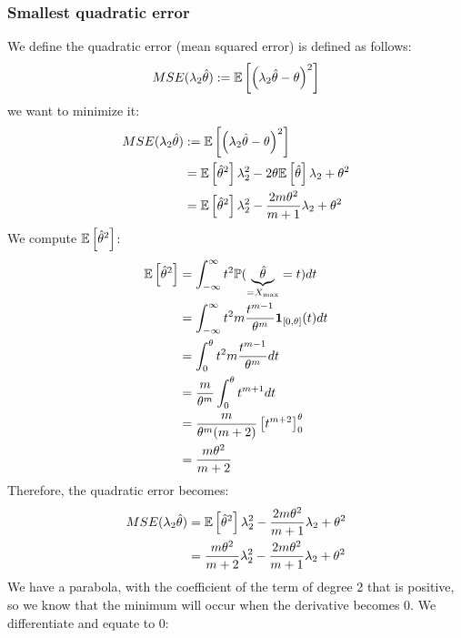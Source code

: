 \documentclass[12pt]{article}
\begin{document}
\subsubsection{Smallest quadratic error}
We define the quadratic error (mean squared error) is defined as follows:
\begin{align*}
    MSE(\lambda_2 \hat{\theta}) := \mathbb{E} \left[\left(\lambda_2 \hat{\theta} - \theta\right)^2 \right]
\end{align*}
we want to minimize it:
\begin{align*}
    MSE(\lambda_2 \hat{\theta})
     & := \mathbb{E} \left[\left(\lambda_2 \hat{\theta} - \theta\right)^2 \right]                                     \\
     & = \mathbb{E} \left[\hat{\theta}^2\right] \lambda_2^2 - 2 \theta \mathbb{E} \left[\hat{\theta}\right] \lambda_2 + \theta^2 \\
     & = \mathbb{E} \left[\hat{\theta}^2\right] \lambda_2^2 - \frac{2m \theta^2}{m+1} \lambda_2 + \theta^2            \\
\end{align*}
We compute \(\mathbb{E} \left[\hat{\theta}^2\right]\):
\begin{align*}
    \mathbb{E} \left[\hat{\theta}^2\right]
     & = \int_{-\infty}^{\infty} t^2 \mathbb{P}(\underbrace{\hat{\theta}}_{=X_{\max}} = t) dt     \\
     & = \int_{-\infty}^{\infty} t^2 m \frac{t^{m-1}}{\theta^m} \mathbf{1}_{[0, \theta]}(t) dt \\
     & = \int_{0}^{\theta} t^2 m \frac{t^{m-1}}{\theta^m} dt                           \\
     & = \frac{m}{\theta^m} \int_{0}^{\theta} t^{m+1} dt                               \\
     & = \frac{m}{\theta^m (m+2)} \left[t^{m+2} \right]_{0}^{\theta}                   \\
     & = \frac{m \theta^{2}}{m+2}                                                      \\
\end{align*}
Therefore, the quadratic error becomes:
\begin{align*}
    MSE(\lambda_2 \hat{\theta})
     & = \mathbb{E} \left[\hat{\theta}^2\right] \lambda_2^2 - \frac{2m \theta^2}{m+1} \lambda_2 + \theta^2 \\
     & = \frac{m \theta^{2}}{m+2} \lambda_2^2 - \frac{2m \theta^2}{m+1} \lambda_2 + \theta^2    \\
\end{align*}
We have a parabola, with the coefficient of the term of degree 2 that is positive, so we know that the minimum will occur when the derivative becomes 0. We differentiate and equate to 0:
\end{document}
